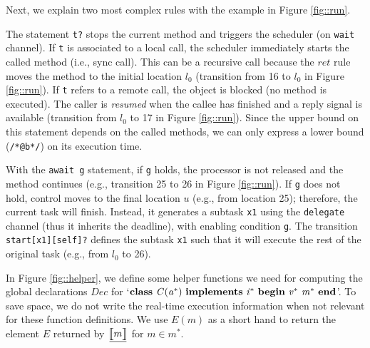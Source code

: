 \documentclass[copyright,creativecommons]{eptcs}
\theoremstyle{definition}
\renewcommand{\paragraph}[1]{\medskip \noindent {\bf #1}}
\newcommand{\id}[1]{\mathit{#1}}
\newcommand{\trule}[1]{\big[\hspace{-.1cm}\underline{\big[#1\big]}\hspace{-.1cm}\big]}
\begin{document}
Next, we explain two most complex rules with the example in Figure \ref{fig::run}.

\paragraph{ret.}
The statement \lstinline{t?} stops the current method and triggers the scheduler (on \lstinline{wait} channel). If \lstinline$t$ is associated to a local call, the scheduler immediately starts the called method (i.e., sync call). This can be a recursive call because the $ret$ rule moves the method to the initial location $l_0$ (transition from 16 to $l_0$ in  Figure \ref{fig::run}). If \lstinline$t$ refers to a remote call, the object is blocked (no method is executed). The caller is {\em resumed} when the callee has finished and a reply signal is available (transition from $l_0$ to 17 in Figure \ref{fig::run}). Since the upper bound on this statement depends on the called methods, we can only express a lower bound (\lstinline{/*@b*/})  on its execution time.

\paragraph{crel.}
With the \lstinline{await g} statement, if \lstinline$g$ holds, the processor is not released and the method continues (e.g., transition 25 to 26 in  Figure \ref{fig::run}).
If \lstinline$g$ does not hold, control moves to the final location $u$ (e.g., from location 25); therefore, the current task will finish. Instead, it generates a subtask \lstinline$x1$ using the \lstinline$delegate$ channel (thus it inherits the deadline), with enabling condition \lstinline$g$. The transition \lstinline$start[x1][self]?$ defines the subtask \lstinline$x1$ such that it will execute the rest of the original task (e.g., from $l_0$ to 26).


\paragraph{Global Declarations}
In Figure \ref{fig::helper}, we define some helper functions we need for computing the global declarations $Dec$ for `$ \id{\bf class} ~ \id{C}( \id{a^*})~ \id{\bf implements}~ \id{i^*} ~ \id{\bf begin} ~\id{v^*} ~\id{m^*} ~\id{\bf end}$'.
To save space, we do not write the real-time execution information when not relevant for these function definitions.
We use  $E(m)$ as a short hand to return the element $E$ returned by $\trule{m}$ for $m \in m^*$.
\end{document}
